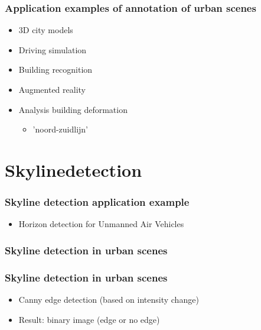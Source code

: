 \documentclass{beamer}
\begin{document}
\frame
{
}
\frame
{
}

\frame
{
	\frametitle{Application examples of annotation of urban scenes}
	\begin{itemize}
	\item 3D city models
	\item Driving simulation
	\item Building recognition
	\item Augmented reality
	\item <+-| alert@+> Analysis building deformation
		\begin{itemize}
		\item <+-| alert@+> 	'noord-zuidlijn'
		\end{itemize}
	\end{itemize}
}

\section{Skylinedetection}
\frame
{
	\frametitle{Skyline detection application example}
	\begin{itemize}
		\item <+-| alert@+> Horizon detection for Unmanned Air Vehicles
	\end{itemize}
}

\frame
{
	\frametitle{Skyline detection in urban scenes}%
}
\frame
{
	\frametitle{Skyline detection in urban scenes}%
	\begin{itemize}
		\item <+-| alert@+> Canny edge detection (based on intensity change)
		\item <+-| alert@+> Result: binary image (edge or no edge)

	\end{itemize}
}
\end{document}
